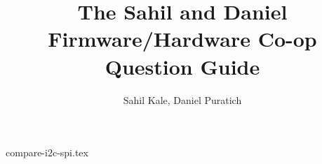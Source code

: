 \documentclass[letterpaper,11pt]{article}
\title{The Sahil and Daniel Firmware/Hardware Co-op Question Guide}
\author{Sahil Kale, Daniel Puratich}
\begin{document}
\maketitle

\tableofcontents

\renewcommand{\thesection}{\Roman{section}}

\newpage


\renewcommand{\thesection}{\arabic{section}}
\setcounter{section}{0} %

\newpage

\newpage

\newpage

\newpage

\newpage

\newpage

\newpage
 {compare-i2c-spi.tex}
\newpage

\newpage

\newpage

\newpage

\newpage

\newpage

\newpage

\newpage

\newpage

\newpage


\newpage
\printbibliography
\end{document}
